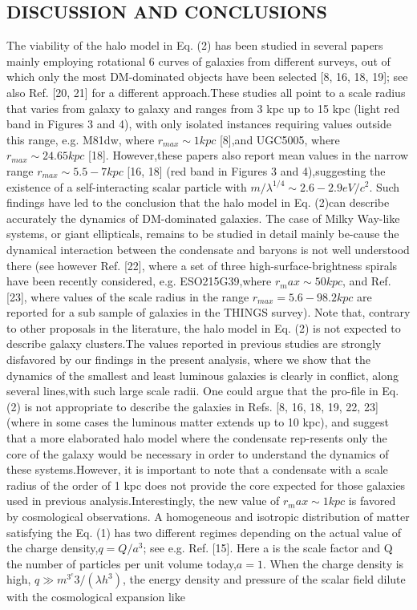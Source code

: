 \documentclass{article}
\begin{document}
\begin{multicols}{2}
\section{DISCUSSION AND CONCLUSIONS}
The  viability  of  the  halo  model  in  Eq.  (2)  has  been studied  in  several  papers  mainly  employing  rotational
6 curves  of  galaxies  from  different  surveys,  out  of  which only  the  most  DM-dominated  objects  have  been  selected  [8,  16,  18,  19];  see  also  Ref.  [20,  21]  for  a  different  approach.These  studies  all  point  to  a  scale radius  that  varies  from  galaxy  to  galaxy  and  ranges from  3 kpc  up  to  15 kpc  (light  red  band  in  Figures  3 and 4), with only isolated instances requiring values outside  this  range,  e.g.   M81dw,  where $r_{max}\sim1kpc$  [8],and  UGC5005,  where $r_{max}\sim24.65kpc $ [18].   However,these papers also report mean values in the narrow range $r_{max}\sim5.5−7kpc$ [16, 18] (red band in Figures 3 and 4),suggesting the existence of a self-interacting scalar particle with $m/\lambda^{1/4}\sim2.6−2.9eV/c^2$.  Such findings have led  to  the  conclusion  that  the  halo  model  in  Eq.  (2)can describe accurately the dynamics of DM-dominated galaxies.  The case of Milky Way-like systems,  or giant ellipticals,  remains  to  be  studied  in  detail  mainly  be-cause the dynamical interaction between the condensate and  baryons  is  not  well  understood  there  (see  however Ref.  [22],  where  a  set  of  three  high-surface-brightness spirals have been recently considered, e.g.  ESO215G39,where $r_max\sim50kpc$, and Ref. [23], where values of the scale  radius  in  the  range $r_{max}=5.6−98.2kpc$  are  reported for a sub sample of galaxies in the THINGS survey).  Note that, contrary to other proposals in the literature, the halo model in Eq. (2) is not expected to describe galaxy clusters.The  values  reported  in  previous  studies  are  strongly disfavored by our findings in the present analysis, where we show that the dynamics of the smallest and least luminous galaxies is clearly in conflict, along several lines,with such large scale radii.  One could argue that the pro-file in Eq. (2) is not appropriate to describe the galaxies in Refs. [8, 16, 18, 19, 22, 23] (where in some cases the luminous matter extends up to 10 kpc), and suggest that a more elaborated halo model where the condensate rep-resents  only  the  core  of  the  galaxy  would  be  necessary in  order  to  understand  the  dynamics  of  these  systems.However, it is important to note that a condensate with a scale radius of the order of 1 kpc does not provide the core expected for those galaxies used in previous analysis.Interestingly,  the  new  value  of $r_max\sim1kpc$  is favored by cosmological observations.  A homogeneous and isotropic distribution of matter satisfying the Eq. (1) has two  different  regimes  depending  on  the  actual  value  of the charge density,$q=Q/a^3$; see e.g.  Ref. [15].  Here a is the scale factor and Q the number of particles per unit volume today,$a= 1$.  When the charge density is high, $q\gg m^3^c3/(\lambda h^3)$, the energy density and pressure of the scalar  field  dilute  with  the  cosmological  expansion  like 
\end{multicols}
\end{document}
